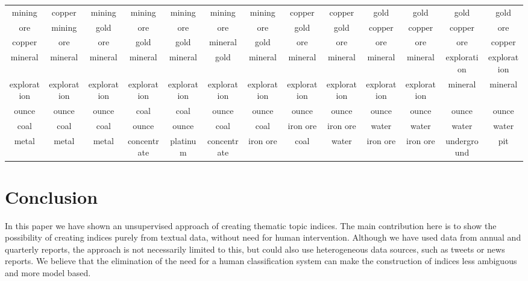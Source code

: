 \documentclass[12pt,journal,letterpaper,oneside,onecolumn]{IEEEtran}
\begin{document}
\begin{table}[!ht]
{\begin{tabular}{c|c|c|c|c|c|c|c|c|c|c|c|c}
mining & copper & mining & mining & mining & mining & mining & copper & copper & gold & gold & gold & gold \\ 
ore & mining & gold & ore & ore & ore & ore & gold & gold & copper & copper & copper & ore \\ 
copper & ore & ore & gold & gold & mineral & gold & ore & ore & ore & ore & ore & copper \\ 
mineral & mineral & mineral & mineral & mineral & gold & mineral & mineral & mineral & mineral & mineral & exploration & exploration \\ 
exploration & exploration & exploration & exploration & exploration & exploration & exploration & exploration & exploration & exploration & exploration & mineral & mineral \\ 
ounce & ounce & ounce & coal & coal & ounce & ounce & ounce & ounce & ounce & ounce & ounce & ounce \\ 
coal & coal & coal & ounce & ounce & coal & coal & iron ore & iron ore & water & water & water & water \\ 
metal & metal & metal & concentrate & platinum & concentrate & iron ore & coal & water & iron ore & iron ore & underground & pit \\ 
    \end{tabular}
    }
\end{table}

\section{Conclusion}
In this paper we have shown an unsupervised approach of creating thematic topic indices. The main contribution here is to show the possibility of creating indices purely from textual data, without need for human intervention.
Although we have used data from annual and quarterly reports, the approach is not necessarily limited to this, but could also use heterogeneous data sources, such as tweets or news reports.
We believe that the elimination of the need for a human classification system can make the construction of indices less ambiguous and more model based.
\end{document}
